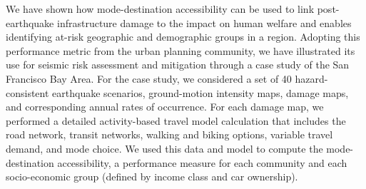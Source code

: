 We have shown how mode-destination accessibility can be used to link post-earthquake infrastructure damage to the impact on human welfare and enables identifying at-risk geographic and demographic groups in a region. 
Adopting this performance metric from the urban planning community, we have illustrated its use for seismic risk assessment and mitigation through a case study of the San Francisco Bay Area. For the case study, we considered a set of 40 hazard-consistent earthquake scenarios, ground-motion intensity maps, damage maps, and corresponding annual rates of occurrence. For each damage map, we performed a detailed activity-based travel model calculation that includes the road network, transit networks, walking and biking options, variable travel demand, and mode choice. We used this data and model to compute the mode-destination accessibility, a performance measure for each community and each socio-economic group (defined by income class and car ownership). 


%

